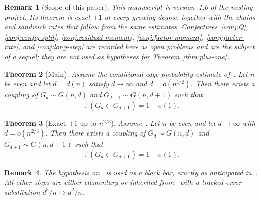\documentclass[11pt]{article}
\newtheorem{theorem}{Theorem}
\newtheorem{remark}[theorem]{Remark}
\newcommand{\Gnd}{G(n,d)}
\newcommand{\PP}{\mathbb{P}}
\begin{document}
\begin{remark}[Scope of this paper]
\label{rem:v1-scope}
This manuscript is version~1.0 of the nesting project.
Its theorem is exact \(+1\) at every growing degree, together with the chains and sandwich rates that follow from the same estimates.
Conjectures~\ref{conj:Q}, \ref{conj:config-split}, \ref{conj:residual-moment}, \ref{conj:factor-moment}, \ref{conj:factor-rate}, and \ref{conj:long-step} are recorded here as open problems and are the subject of a sequel; they are not used as hypotheses for Theorem~\ref{thm:plus-one}.
\end{remark}

\begin{theorem}[Main]
\label{thm:main}
Assume the conditional edge-probability estimate of~\cite[Theorem~6]{Gao20}.
Let \(n\) be even and let \(d=d(n)\) satisfy \(d\to\infty\) and
\(d=o(n^{1/2})\).
Then there exists a coupling of \(G_d\sim\Gnd\) and \(G_{d+1}\sim G(n,d+1)\) such that
\[
\PP(G_d\subset G_{d+1})=1-o(1).
\]
\end{theorem}

\begin{theorem}[Exact \(+1\) up to \(n^{2/3}\)]
\label{thm:two-thirds}
Assume~\cite[Theorem~6]{Gao20}.
Let \(n\) be even and let \(d\to\infty\) with \(d=o(n^{2/3})\).
Then there exists a coupling of \(G_d\sim\Gnd\) and \(G_{d+1}\sim G(n,d+1)\) such that
\[
\PP(G_d\subset G_{d+1})=1-o(1).
\]
\end{theorem}

\begin{remark}
The hypothesis on~\cite{Gao20} is used as a black box, exactly as anticipated
in~\cite{Gao21}.
All other steps are either elementary or inherited from~\cite{Gao21} with a
tracked error substitution \(d^3/n\mapsto d^2/n\).
\end{remark}
\end{document}
